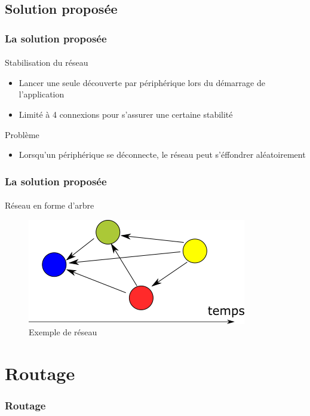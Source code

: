 \documentclass{beamer}
\begin{document}
    \subsection{Solution proposée}
    \begin{frame}
      \frametitle{La solution proposée}
      \framesubtitle{}
      \begin{block}{Stabilisation du réseau}
        \begin{itemize}
          \item Lancer une seule découverte par périphérique lors du démarrage de l'application
          \item Limité à 4 connexions pour s'assurer une certaine stabilité
        \end{itemize}
      \end{block}
      \begin{block}{Problème}
        \begin{itemize}
          \item Lorsqu'un périphérique se déconnecte, le réseau peut s'éffondrer aléatoirement
        \end{itemize}
      \end{block}
    \end{frame}
    \begin{frame}
      \frametitle{La solution proposée}
      \framesubtitle{}
      \begin{block}{Réseau en forme d'arbre}
        \begin{figure}
          \begin{center}
            \includegraphics[width=.5\textwidth]{images/auto.png}
            \caption{Exemple de réseau}
            \label{fig:auto}
          \end{center}
        \end{figure}
      \end{block}
    \end{frame}

  \section{Routage}
  \begin{frame}
    \frametitle{Routage}
    \framesubtitle{}
  
  \end{frame}
  
\end{document}
